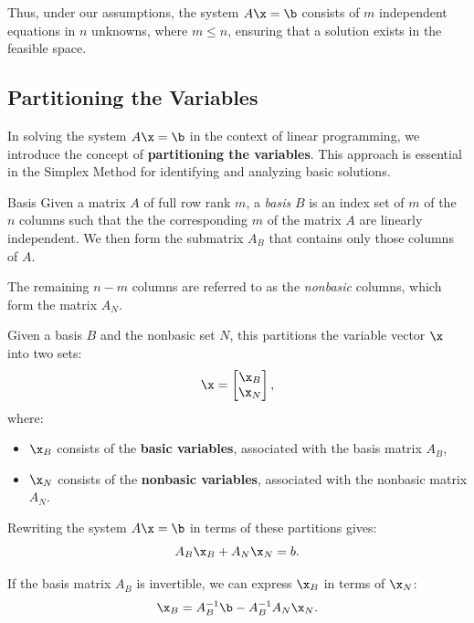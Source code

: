 Thus, under our assumptions, the system \( A\x =\b\) consists of \( m \) independent equations in \( n \) unknowns, where \( m \leq n \), ensuring that a solution exists in the feasible space.


\subsection{Partitioning the Variables}

In solving the system \( A\x =\b\) in the context of linear programming, we introduce the concept of \textbf{partitioning the variables}. This approach is essential in the Simplex Method for identifying and analyzing basic solutions.

\begin{definition}{Basis}{}{}
Given a matrix $A$ of full row rank $m$, a \emph{basis} $B$ is an index set of $m$ of the $n$ columns such that the the corresponding $m$  of the matrix $A$ are linearly independent.  We then form the submatrix $A_B$ that contains only those columns of $A$. 

 The remaining \( n - m \) columns are referred to as the \emph{nonbasic} columns, which form the matrix \( A_N \). 
 \end{definition}
 
 Given a basis $B$ and the nonbasic set $N$, this partitions the variable vector \( \x \) into two sets:
\[
\x =
\begin{bmatrix}
    \x_B \\ \x_N
\end{bmatrix},
\]
where:
\begin{itemize}
\item  \( \x_B \) consists of the \textbf{basic variables}, associated with the basis matrix \( A_B \),
\item\( \x_N \) consists of the \textbf{nonbasic variables}, associated with the nonbasic matrix \( A_N \).
\end{itemize}

Rewriting the system \( A\x =\b\) in terms of these partitions gives:
\begin{equation}
A_B \x_B + A_N \x_N = b.
\end{equation}

If the basis matrix \( A_B \) is invertible, we can express \( \x_B \) in terms of \( \x_N \):
\begin{equation}
\x_B = A_B^{-1}\b- A_B^{-1} A_N \x_N.
\end{equation}

